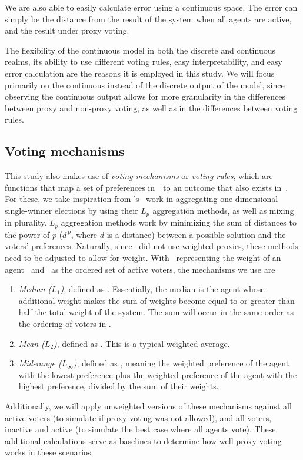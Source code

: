 We are also able to easily calculate error using a continuous space.
The error can simply be the distance from the result of the system when all agents
are active, and the result under proxy voting.

The flexibility of the continuous model in both the discrete and continuous realms, its
ability to use different voting rules, easy interpretability, and easy error
calculation are the reasons it is employed in this study.
We will focus primarily on the continuous instead of the discrete output of the
model, since observing the continuous output allows for more granularity in the
differences between proxy and non-proxy voting, as well as in the differences between
voting rules.

\subsection{Voting mechanisms}\label{subsec:voting-mechanisms}
This study also makes use of \textit{voting mechanisms} or \textit{voting rules},
which are functions that map a set of preferences in~\systemspace\ to an outcome that
also exists in~\systemspace.
For these, we take inspiration from 's~\cite{Bulteau2021} work in
aggregating one-dimensional single-winner elections by using their $L_p$ aggregation
methods, as well as mixing in plurality.
$L_p$ aggregation methods work by minimizing the sum of distances to the power of $p$
($d^{\,p}$, where $d$ is a distance) between a possible solution and the voters'
preferences.
Naturally, since~\cite{Bulteau2021} did not use weighted proxies, these methods need
to be adjusted to allow for weight.
With \agentweight\ representing the weight of an agent \agent\ and \systemproxies\ as
the ordered set of active voters, the mechanisms we use are
\begin{enumerate}
    \item {
        \textit{Median ($L_1$)}, defined as
        $$.
        Essentially, the median is the agent whose additional weight makes the sum of
        weights become equal to or greater than half the total weight of the system.
        The sum will occur in the same order as the ordering of voters in
        \systemproxies.
    }
    \item {
        \textit{Mean ($L_2$)}, defined as
        $$.
        This is a typical weighted average.
    }
    \item {
        \textit{Mid-range ($L_\infty$)}, defined as
        $$, meaning the weighted
        preference of the agent with the lowest preference plus the weighted
        preference of the agent with the highest preference, divided by the sum of
        their weights.
    }
\end{enumerate}
Additionally, we will apply unweighted versions of these mechanisms against all active
voters (to simulate if proxy voting was not allowed), and all voters, inactive and
active (to simulate the best case where all agents vote).
These additional calculations serve as baselines to determine how well proxy voting
works in these scenarios.

